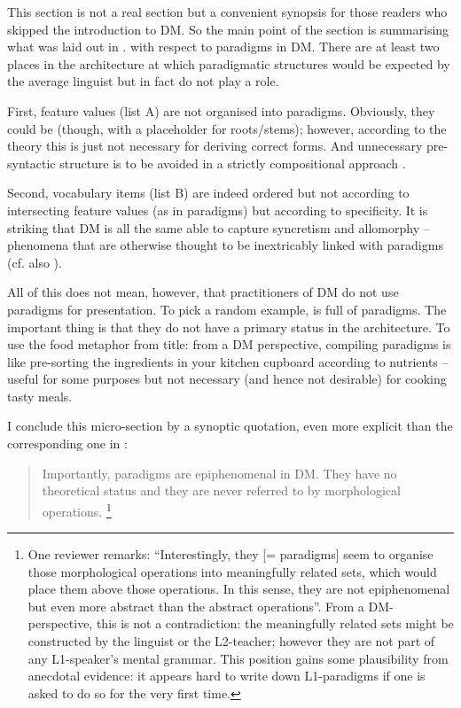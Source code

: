 \documentclass[output=paper]{langsci/langscibook}
\begin{document}
This section is not a real section but a convenient synopsis for those readers who skipped the introduction to DM. So the main point of the section is summarising what was laid out in . with respect to paradigms in DM. There are at least two places in the architecture at which paradigmatic structures would be expected by the average linguist but in fact do not play a role.

First, feature values (list A) are not organised into paradigms. Obviously, they could be (though, with a placeholder for roots/stems); however, according to the theory this is just not necessary for deriving correct forms. And unnecessary pre-syntactic structure is to be avoided in a strictly compositional approach \citep[17]{Embick2015}.\largerpage[1.5]

Second, vocabulary items (list B) are indeed ordered but not according to intersecting feature values (as in paradigms) but according to specificity. It is striking that DM is all the same able to capture syncretism and allomorphy – phenomena that are otherwise thought to be inextricably linked with paradigms (cf. also \citealt[54]{Bobaljik2002}).

All of this does not mean, however, that practitioners of DM do not use paradigms for presentation. To pick a random example, \citet{Harley2008} is full of paradigms. The important thing is that they do not have a primary status in the architecture. To use the food metaphor from  title: from a DM perspective, compiling paradigms is like pre-sorting the ingredients in your kitchen cupboard according to nutrients – useful for some purposes but not necessary (and hence not desirable) for cooking tasty meals.

I conclude this micro-section by a synoptic quotation, even more explicit than the corresponding one in :

\begin{quote}
Importantly, paradigms are epiphenomenal in DM. They have no theoretical status and they are never referred to by morphological operations. \citep[97]{Kramer2016}\footnote{One reviewer remarks: “Interestingly, they [= paradigms] seem to organise those morphological operations into meaningfully related sets, which would place them above those operations. In this sense, they are not epiphenomenal but even more abstract than the abstract operations”. From a DM-perspective, this is not a contradiction: the meaningfully related sets might be constructed by the linguist or the L2-teacher; however they are not part of any L1-speaker’s mental grammar. This position gains some plausibility from anecdotal evidence: it appears hard to write down L1-paradigms if one is asked to do so for the very first time.}
\end{quote}
\end{document}
